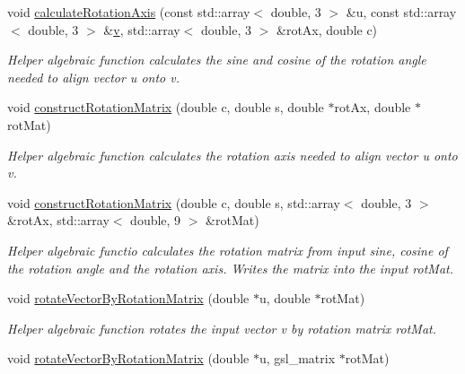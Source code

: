 \begin{DoxyCompactItemize}
\item 
\hypertarget{classShapeBase_a06df78e90e5d7bcb9898c2844ecf2e60}{}void \hyperlink{classShapeBase_a06df78e90e5d7bcb9898c2844ecf2e60}{calculate\+Rotation\+Axis} (const std\+::array$<$ double, 3 $>$ \&u, const std\+::array$<$ double, 3 $>$ \&\hyperlink{classShapeBase_a8b4c2d3bfbc6c9785c5181a56f929151}{v}, std\+::array$<$ double, 3 $>$ \&rot\+Ax, double c)\label{classShapeBase_a06df78e90e5d7bcb9898c2844ecf2e60}

\begin{DoxyCompactList}\small\item\em Helper algebraic function calculates the sine and cosine of the rotation angle needed to align vector u onto v. \end{DoxyCompactList}\item 
void \hyperlink{classShapeBase_ac5ea30d81c19c9f7c904af66310c750b}{construct\+Rotation\+Matrix} (double c, double s, double $\ast$rot\+Ax, double $\ast$rot\+Mat)
\begin{DoxyCompactList}\small\item\em Helper algebraic function calculates the rotation axis needed to align vector u onto v. \end{DoxyCompactList}\item 
\hypertarget{classShapeBase_a4c9e11497d04d084fdfe72654bbfb174}{}void \hyperlink{classShapeBase_a4c9e11497d04d084fdfe72654bbfb174}{construct\+Rotation\+Matrix} (double c, double s, std\+::array$<$ double, 3 $>$ \&rot\+Ax, std\+::array$<$ double, 9 $>$ \&rot\+Mat)\label{classShapeBase_a4c9e11497d04d084fdfe72654bbfb174}

\begin{DoxyCompactList}\small\item\em Helper algebraic functio calculates the rotation matrix from input sine, cosine of the rotation angle and the rotation axis. Writes the matrix into the input rot\+Mat. \end{DoxyCompactList}\item 
\hypertarget{classShapeBase_ad803a237b7e7c06d419a308625a599e0}{}void \hyperlink{classShapeBase_ad803a237b7e7c06d419a308625a599e0}{rotate\+Vector\+By\+Rotation\+Matrix} (double $\ast$u, double $\ast$rot\+Mat)\label{classShapeBase_ad803a237b7e7c06d419a308625a599e0}

\begin{DoxyCompactList}\small\item\em Helper algebraic function rotates the input vector v by rotation matrix rot\+Mat. \end{DoxyCompactList}\item 
\hypertarget{classShapeBase_a14a573072213ea91314c8f1101f106bb}{}void \hyperlink{classShapeBase_a14a573072213ea91314c8f1101f106bb}{rotate\+Vector\+By\+Rotation\+Matrix} (double $\ast$u, gsl\+\_\+matrix $\ast$rot\+Mat)\label{classShapeBase_a14a573072213ea91314c8f1101f106bb}


\end{DoxyCompactItemize}
